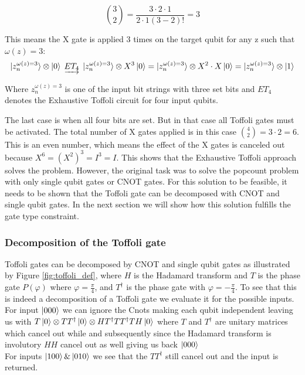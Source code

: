 \documentclass[12pt,a4paper]{article}
\begin{document}
\[
\binom{3}{2} = \frac{3\cdot2\cdot1}{2\cdot1(3-2)!} = 3
\]

This means the X gate is applied 3 times on the target qubit for any z such that \(\omega(z) = 3\): 
\[
\ket{z_n^{\omega(z)=3}} \otimes \ket{0} \; \underrightarrow{ET_4} \; \ket{z_n^{\omega(z )=3}} \otimes X^{3}\ket{0} = \ket{z_n^{\omega(z)=3}} \otimes X^2\cdot X \ket{0} = \ket{z_n^{\omega(z)=3}} \otimes \ket{1}
\]

Where \(z_n^{\omega(z)=3}\) is one of the input bit strings with three set bits and \(ET_4\) denotes the Exhaustive Toffoli circuit for four input qubits. 

The last case is when all four bits are set. But in that case all Toffoli gates must be activated. The total number of X gates applied is in this case \(\binom{4}{2} = 3\cdot2 = 6\). This is an even number, which means the effect of the X gates is canceled out because \(X^6 = (X^2)^3 = I^3 = I\). This shows that the Exhaustive Toffoli approach solves the problem. However, the original task was to solve the popcount problem with only single qubit gates or CNOT gates. For this solution to be feasible, it needs to be shown that the Toffoli gate can be decomposed with CNOT and single qubit gates. In the next section we will show how this solution fulfills the gate type constraint.

\subsubsection{Decomposition of the Toffoli gate}

Toffoli gates can be decomposed by CNOT and single qubit gates\cite{barenco_elementary_1995} as illustrated by Figure \ref{fig:toffoli_def}, where \(H\) is the Hadamard transform and \(T\) is the phase gate $P(\varphi)$ where $\varphi = \frac{\pi}{4}$, and \(T^{\dagger}\) is the phase gate with $\varphi = -\frac{\pi}{4}$.
To see that this is indeed a decomposition of a Toffoli gate we evaluate it for the possible inputs. 
For input \(\ket{000}\) we can ignore the Cnots making each qubit independent leaving us with \(T\ket{0}\otimes TT^{\dagger}\ket{0} \otimes H T^{\dagger}TT^{\dagger}T H \ket{0}\) where \(T\) and \(T^{\dagger}\) are unitary matrices which cancel out while and subsequently since the Hadamard transform is involutory \(HH\) cancel out as well giving us back \(\ket{000}\)\\
For inputs $\ket{100} \& \ket{010}$ we see that the $TT^{\dagger}$ still cancel out and the input is returned.
\end{document}
